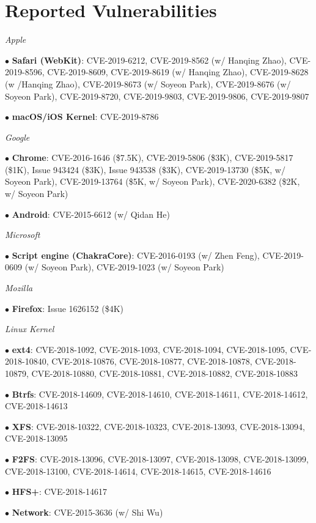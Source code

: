 \clearpage

\section*{Reported Vulnerabilities}
\begin{description}
\item {\emph{Apple}}
\item $\bullet$ \textbf{Safari (WebKit)}: 
	CVE-2019-6212,
	CVE-2019-8562 (w/ Hanqing Zhao), 
	CVE-2019-8596, 
	CVE-2019-8609,
	CVE-2019-8619 (w/ Hanqing Zhao), 
	CVE-2019-8628 (w /Hanqing Zhao), 
	CVE-2019-8673 (w/ Soyeon Park), 
	CVE-2019-8676 (w/ Soyeon Park), 
	CVE-2019-8720,
	CVE-2019-9803,
	CVE-2019-9806,
	CVE-2019-9807

\item $\bullet$ \textbf{macOS/iOS Kernel}: CVE-2019-8786

\item {\emph{Google}}
\item $\bullet$ \textbf{Chrome}: 
	CVE-2016-1646 (\$7.5K),
	CVE-2019-5806 (\$3K), 
	CVE-2019-5817 (\$1K), 
	Issue 943424 (\$3K), 
	Issue 943538 (\$3K), 
	CVE-2019-13730 (\$5K, w/ Soyeon Park), 
	CVE-2019-13764 (\$5K, w/ Soyeon Park), 
	CVE-2020-6382 (\$2K, w/ Soyeon Park)

\item $\bullet$ \textbf{Android}: CVE-2015-6612 (w/ Qidan He)

\item {\emph{Microsoft}}
	\item $\bullet$ \textbf{Script engine (ChakraCore)}: 
		CVE-2016-0193 (w/ Zhen Feng), 
		CVE-2019-0609 (w/ Soyeon Park), 
		CVE-2019-1023 (w/ Soyeon Park)

\item {\emph{Mozilla}}
	\item $\bullet$ \textbf{Firefox}:
		Issue 1626152 (\$4K)

\item {\emph{Linux Kernel}}
    \item $\bullet$ \textbf{ext4}: 
    	CVE-2018-1092,
    	CVE-2018-1093,
    	CVE-2018-1094,
    	CVE-2018-1095,
    	CVE-2018-10840,
    	CVE-2018-10876,
    	CVE-2018-10877,
    	CVE-2018-10878,
    	CVE-2018-10879,
    	CVE-2018-10880,
    	CVE-2018-10881,
    	CVE-2018-10882,
    	CVE-2018-10883
    \item $\bullet$ \textbf{Btrfs}: 
    	CVE-2018-14609,
    	CVE-2018-14610,
    	CVE-2018-14611,
    	CVE-2018-14612,
    	CVE-2018-14613
    \item $\bullet$ \textbf{XFS}: 
        CVE-2018-10322,
    	CVE-2018-10323,
    	CVE-2018-13093,
    	CVE-2018-13094,
    	CVE-2018-13095
    \item $\bullet$ \textbf{F2FS}: 
    	CVE-2018-13096,
    	CVE-2018-13097,
    	CVE-2018-13098,
    	CVE-2018-13099,
    	CVE-2018-13100,
    	CVE-2018-14614,
    	CVE-2018-14615,
    	CVE-2018-14616
	\item $\bullet$ \textbf{HFS+}: CVE-2018-14617
	\item $\bullet$ \textbf{Network}: CVE-2015-3636 (w/ Shi Wu)


\end{description}
